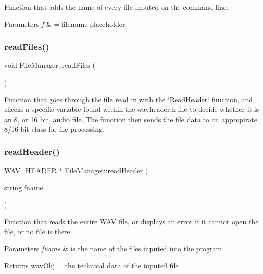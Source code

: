 Function that adds the name of every file inputed on the command line. 
\begin{DoxyParams}{Parameters}
{\em f} & = filename placeholder. \\
\hline
\end{DoxyParams}
\mbox{\label{classFileManager_a2161783ca1618e76cf37dec25687ea5a}} 
\subsubsection{\texorpdfstring{read\+Files()}{readFiles()}}
{\footnotesize\ttfamily void File\+Manager\+::read\+Files (\begin{DoxyParamCaption}{ }\end{DoxyParamCaption})}

Function that goes through the file read in with the \char`\"{}\+Read\+Header\char`\"{} function, and checks a specific variable found within the wavheader.\+h file to decide whether it is an 8, or 16 bit, audio file. The function then sends the file data to an appropirate 8/16 bit class for file processing. \mbox{\label{classFileManager_a2db2e663db1df9cc19983f1bc642cf3a}} 
\subsubsection{\texorpdfstring{read\+Header()}{readHeader()}}
{\footnotesize\ttfamily \hyperlink{structWAV__HEADER}{W\+A\+V\+\_\+\+H\+E\+A\+D\+ER} $\ast$ File\+Manager\+::read\+Header (\begin{DoxyParamCaption}\item[{string}]{fname }\end{DoxyParamCaption})}

Function that reads the entire W\+AV file, or displays an error if it cannot open the file, or no file is there. 
\begin{DoxyParams}{Parameters}
{\em fname} & is the name of the files inputed into the program \\
\hline
\end{DoxyParams}
\begin{DoxyReturn}{Returns}
wav\+Obj = the technical data of the inputed file 
\end{DoxyReturn}
\mbox{\label{classFileManager_a8c9d83a8d5e00e0f33e9c7bc64ab7c15}} 
